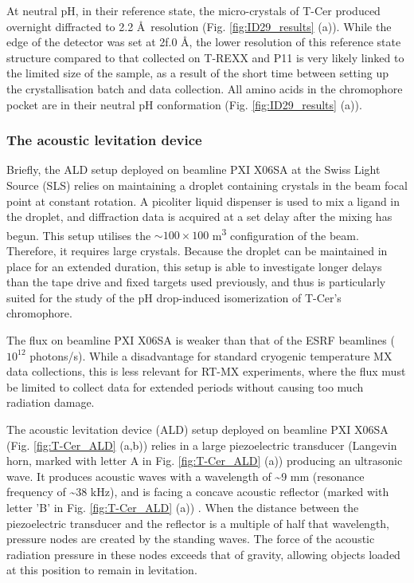 At neutral pH, in their reference state, the micro-crystals of T-Cer produced overnight diffracted to 2.2 \AA\ resolution (Fig. \ref{fig:ID29_results} (a)). While the edge of the detector was set at 2f.0 \AA, the lower resolution of this reference state structure compared to that collected on T-REXX and P11 is very likely linked to the limited size of the sample, as a result of the short time between setting up the crystallisation batch and data collection. All amino acids in the chromophore pocket are in their neutral pH conformation (Fig. \ref{fig:ID29_results} (a)). 

\subsubsection{The acoustic levitation device}\label{sec:ALD}

Briefly, the ALD setup deployed on beamline PXI X06SA at the Swiss Light Source (SLS) \parencite{tsujinoUltrasonicAcousticLevitation2016, kepaAcousticLevitationRotation2022} relies on maintaining a droplet containing crystals in the beam focal point at constant rotation. A picoliter liquid dispenser is used to mix a ligand in the droplet, and diffraction data is acquired at a set delay after the mixing has begun. This setup utilises the \(\sim 100 \times 100 \) \textmu m\textsuperscript{3} configuration of the beam. Therefore, it requires large crystals. Because the droplet can be maintained in place for an extended duration, this setup is able to investigate longer delays than the tape drive and fixed targets used previously, and thus is particularly suited for the study of the pH drop-induced isomerization of T-Cer's chromophore. 

The flux on beamline PXI X06SA is weaker than that of the ESRF beamlines (\(10^{12}\) photons/s). While a disadvantage for standard cryogenic temperature MX data collections, this is less relevant for RT-MX experiments, where the flux must be limited to collect data for extended periods without causing too much radiation damage. 

The acoustic levitation device (ALD) setup deployed on beamline PXI X06SA (Fig. \ref{fig:T-Cer_ALD} (a,b)) relies in a large piezoelectric transducer (Langevin horn, marked with letter A in Fig. \ref{fig:T-Cer_ALD} (a)) producing an ultrasonic wave. It produces acoustic waves with a wavelength of \textasciitilde 9 mm (resonance frequency of \textasciitilde 38 kHz), and is facing a concave acoustic reflector (marked with letter 'B' in Fig. \ref{fig:T-Cer_ALD} (a)) \parencite{tsujinoUltrasonicAcousticLevitation2016}. When the distance between the piezoelectric transducer and the reflector is a multiple of half that wavelength, pressure nodes are created by the standing waves. The force of the acoustic radiation pressure in these nodes exceeds that of gravity, allowing objects loaded at this position to remain in levitation.  

